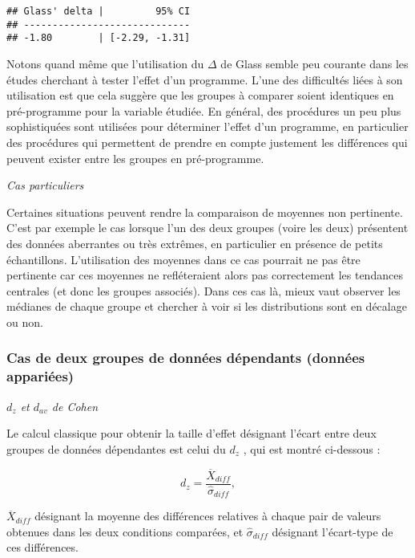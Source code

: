 \documentclass[
]{book}
\begin{document}
\begin{verbatim}
## Glass' delta |         95% CI
## -----------------------------
## -1.80        | [-2.29, -1.31]
\end{verbatim}

Notons quand même que l'utilisation du \(\Delta\) de Glass semble peu courante dans les études cherchant à tester l'effet d'un programme. L'une des difficultés liées à son utilisation est que cela suggère que les groupes à comparer soient identiques en pré-programme pour la variable étudiée. En général, des procédures un peu plus sophistiquées sont utilisées pour déterminer l'effet d'un programme, en particulier des procédures qui permettent de prendre en compte justement les différences qui peuvent exister entre les groupes en pré-programme.

\emph{Cas particuliers}

Certaines situations peuvent rendre la comparaison de moyennes non pertinente. C'est par exemple le cas lorsque l'un des deux groupes (voire les deux) présentent des données aberrantes ou très extrêmes, en particulier en présence de petits échantillons. L'utilisation des moyennes dans ce cas pourrait ne pas être pertinente car ces moyennes ne refléteraient alors pas correctement les tendances centrales (et donc les groupes associés). Dans ces cas là, mieux vaut observer les médianes de chaque groupe et chercher à voir si les distributions sont en décalage ou non.

\hypertarget{cas-de-deux-groupes-de-donnuxe9es-duxe9pendants-donnuxe9es-appariuxe9es}{%
\subsubsection{Cas de deux groupes de données dépendants (données appariées)}\label{cas-de-deux-groupes-de-donnuxe9es-duxe9pendants-donnuxe9es-appariuxe9es}}

\emph{\(d_{z}\) et \(d_{av}\) de Cohen}

Le calcul classique pour obtenir la taille d'effet désignant l'écart entre deux groupes de données dépendantes est celui du \(d_{z}\) \autocite{lakensCalculatingReportingEffect2013}, qui est montré ci-dessous :

\[d_{z} = \frac{\overline{X} _{diff}}{\hat{\sigma}_{diff}},\]

\(\overline{X}_{diff}\) désignant la moyenne des différences relatives à chaque pair de valeurs obtenues dans les deux conditions comparées, et \(\hat{\sigma}_{diff}\) désignant l'écart-type de ces différences.
\end{document}
